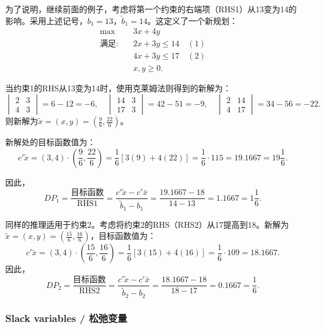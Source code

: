 \begin{translation}
为了说明，继续前面的例子，考虑将第一个约束的右端项（RHS1）从13变为14的影响。采用上述记号，$b_1 = 13$，$\tilde{b}_1 = 14$。这定义了一个新规划：
\[
\begin{aligned}
\max \quad & 3x + 4y \\
\text{满足:} \quad & 2x + 3y \le 14 \quad (1) \\
& 4x + 3y \le 17 \quad (2) \\
& x, y \ge 0.
\end{aligned}
\]

当约束1的RHS从13变为14时，使用克莱姆法则得到的新解为：
\[
\begin{vmatrix} 2 & 3 \\ 4 & 3 \end{vmatrix} = 6 - 12 = -6,\quad
\begin{vmatrix} 14 & 3 \\ 17 & 3 \end{vmatrix} = 42 - 51 = -9,\quad
\begin{vmatrix} 2 & 14 \\ 4 & 17 \end{vmatrix} = 34 - 56 = -22.
\]
则新解为$\tilde{x} = (x, y) = \left(\frac{9}{6}, \frac{22}{6}\right)$。

新解处的目标函数值为：
\[
c'\tilde{x} = (3,4) \cdot \left(\frac{9}{6}, \frac{22}{6}\right) = \frac{1}{6}[3(9) + 4(22)] = \frac{1}{6} \cdot 115 = 19.1667 = 19\frac{1}{6}.
\]

因此，
\[
DP_1 = \frac{\text{目标函数}}{\text{RHS1}} = \frac{c'\tilde{x} - c'\bar{x}}{\tilde{b}_1 - b_1} = \frac{19.1667 - 18}{14 - 13} = 1.1667 = 1\frac{1}{6}.
\]

同样的推理适用于约束2。考虑将约束2的RHS（RHS2）从17提高到18。新解为$\tilde{x} = (x, y) = \left(\frac{15}{6}, \frac{16}{6}\right)$，目标函数值为：
\[
c'\tilde{x} = (3,4) \cdot \left(\frac{15}{6}, \frac{16}{6}\right) = \frac{1}{6}[3(15) + 4(16)] = \frac{1}{6} \cdot 109 = 18.1667.
\]
因此，
\[
DP_2 = \frac{\text{目标函数}}{\text{RHS2}} = \frac{c'\tilde{x} - c'\bar{x}}{\tilde{b}_2 - b_2} = \frac{18.1667 - 18}{18 - 17} = 0.1667 = \frac{1}{6}.
\]
\end{translation}

\subsubsection{Slack variables / 松弛变量}

